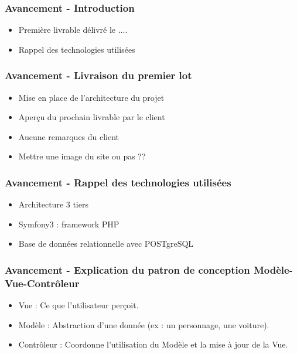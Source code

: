 \speaker{\Kafui}

\begin{frame}
  \frametitle{Avancement - Introduction}
  \begin{itemize}
	\item Première livrable délivré le ....
	\item Rappel des technologies utilisées
  \end{itemize}
\end{frame}

\begin{frame}
  \frametitle{Avancement - Livraison du premier lot}
  \begin{itemize}
	\item Mise en place de l'architecture du projet
	\item Aperçu du prochain livrable par le client
	\item Aucune remarques du client
	\item Mettre une image du site ou pas ??
  \end{itemize}
\end{frame}

\begin{frame}
  \frametitle{Avancement - Rappel des technologies utilisées}
  \begin{itemize}
	\item Architecture 3 tiers
	\item Symfony3 : framework PHP 
	\item Base de données relationnelle avec POSTgreSQL
  \end{itemize}
\end{frame}

\begin{frame}
  \frametitle{Avancement - Explication du patron de conception Modèle-Vue-Contrôleur}
  \begin{itemize}
	\item Vue : Ce que l'utilisateur perçoit.
	\item Modèle : Abstraction d'une donnée (ex : un personnage, une voiture).
	\item Contrôleur : Coordonne l'utilisation du Modèle et la mise à jour de la Vue.
  \end{itemize}
\end{frame}
